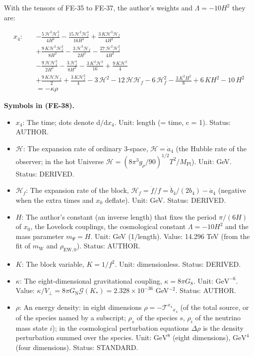 \documentclass[
  10pt,
]{article}
\providecommand{\tightlist}{%
  \setlength{\itemsep}{0pt}\setlength{\parskip}{0pt}}
\begin{document}
With the tensors of FE-35 to FE-37, the author's weights and
\(\Lambda = -10H^2\) they are:

\[
\begin{aligned}
x_4:\quad &-\frac{5\,\mathcal{H}^{3}\mathcal{H}_f^{3}}{4H^{4}} -
 \frac{15\,\mathcal{H}^{2}\mathcal{H}_f^{4}}{16H^{4}} + \frac{3\,K\mathcal{H}^{3}\mathcal{H}_f}{4H^{2}} \\
 &+ \frac{9\,K\mathcal{H}^{2}\mathcal{H}_f^{2}}{8H^{2}} - \frac{3\,\mathcal{H}^{3}\mathcal{H}_f}{2H^{2}}
 - \frac{27\,\mathcal{H}^{2}\mathcal{H}_f^{2}}{4H^{2}} \\
 &- \frac{9\,\mathcal{H}\mathcal{H}_f^{3}}{2H^{2}} - \frac{3\,\mathcal{H}_f^{4}}{8H^{2}} -
 \frac{3\,K^{2}\mathcal{H}^{2}}{16} + \frac{9\,K\mathcal{H}^{2}}{4} \\
 &+ \frac{9\,K\mathcal{H}\mathcal{H}_f}{2} + \frac{3\,K\mathcal{H}_f^{2}}{4} - 3\,\mathcal{H}^{2} -
 12\,\mathcal{H}\mathcal{H}_f - 6\,\mathcal{H}_f^{2} - \frac{3\,K^{2}H^{2}}{8} + 6\,KH^{2} - 10\,H^{2} \\
 &= -\kappa\rho
\end{aligned} \tag{FE-38}
\]

\textbf{Symbols in (FE-38).}

\begin{itemize}
\tightlist
\item
  \(x_4\): The time; dots denote \(\mathrm{d}/\mathrm{d}x_4\). Unit:
  length (= time, c = 1). Status: AUTHOR.
\item
  \(\mathcal{H}\): The expansion rate of ordinary 3-space,
  \(\mathcal{H} = \dot a_4\) (the Hubble rate of the observer; in the
  hot Universe
  \(\mathcal{H} = (8\pi^3g_\rho/90)^{1/2}T^2/M_{\mathrm{Pl}}\)). Unit:
  GeV. Status: DERIVED.
\item
  \(\mathcal{H}_f\): The expansion rate of the block,
  \(\mathcal{H}_f = \dot f/f = \dot b_4/(2b_4) - \dot a_4\) (negative
  when the extra times and \(x_0\) deflate). Unit: GeV. Status: DERIVED.
\item
  \(H\): The author's constant (an inverse length) that fixes the period
  \(\pi/(6H)\) of \(x_0\), the Lovelock couplings, the cosmological
  constant \(\Lambda = -10H^2\) and the mass parameter \(m_\Psi = H\).
  Unit: GeV (1/length). Value: 14.296 TeV (from the fit of
  \(m_{\mathrm{W}}\) and \(\rho_{\mathrm{EW},0}\)). Status: AUTHOR.
\item
  \(K\): The block variable, \(K = 1/f^2\). Unit: dimensionless. Status:
  DERIVED.
\item
  \(\kappa\): The eight-dimensional gravitational coupling,
  \(\kappa = 8\pi G_8\). Unit: \(\mathrm{GeV}^{-6}\). Value:
  \(\kappa/V_\perp = 8\pi G_{\mathrm{N}}\mathcal{G}(K_*) = 2.328\times10^{-36}\)
  GeV\(^{-2}\). Status: AUTHOR.
\item
  \(\rho\): An energy density: in eight dimensions
  \(\rho = -\mathcal{T}^{x_4}{}_{x_4}\) (of the total source, or of the
  species named by a subscript; \(\rho_s\) of the species \(s\),
  \(\rho_i\) of the neutrino mass state \(i\)); in the cosmological
  perturbation equations \(\Delta\rho\) is the density perturbation
  summed over the species. Unit: \(\mathrm{GeV}^{8}\) (eight
  dimensions), \(\mathrm{GeV}^{4}\) (four dimensions). Status: STANDARD.
\end{itemize}
\end{document}
